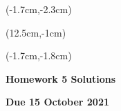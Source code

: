 \documentclass[12pt, oneside]{article}
\begin{document}
\begin{textblock*}{4cm}(-1.7cm,-2.3cm)
\end{textblock*}

\begin{textblock*}{8cm}(12.5cm,-1cm)
\end{textblock*}
\begin{textblock*}{13.5cm}(-1.7cm,-1.8cm)
\end{textblock*}

\vspace{1cm}

\begin{center}
\textbf{\Large Homework 5 Solutions}

\textbf{Due 15 October 2021}
\end{center}
\end{document}
